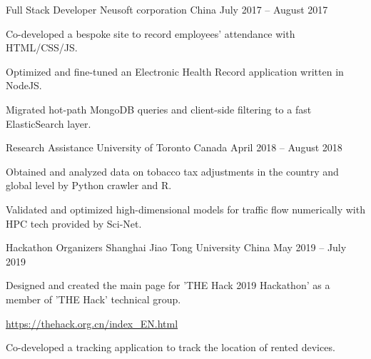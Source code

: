 

\begin{cventries}

  \cventry
    {Full Stack Developer} %
    {Neusoft corporation} %
    {China} %
    {July 2017 – August 2017} %
    {
      \begin{cvitems} %
        \item {Co-developed a bespoke site to record employees’ attendance with HTML/CSS/JS.}
        \item {Optimized and fine-tuned an Electronic Health Record application written in NodeJS.}
        \item {Migrated hot-path MongoDB queries and client-side filtering to a fast ElasticSearch layer.}
      \end{cvitems}
    }

  \cventry
    {Research Assistance} %
    {University of Toronto} %
    {Canada} %
    {April 2018 – August 2018} %
    {
      \begin{cvitems} %
        \item {Obtained and analyzed data on tobacco tax adjustments in the country and global level by Python crawler and R.}
        \item {Validated and optimized high-dimensional models for traffic flow numerically with HPC tech provided by Sci-Net.}
      \end{cvitems}
    }

  \cventry
    {Hackathon Organizers} %
    {Shanghai Jiao Tong University} %
    {China} %
    {May 2019 – July 2019} %
    {
      \begin{cvitems} %
        \item {Designed and created the main page for 'THE Hack 2019 Hackathon' as a member of 'THE Hack' technical group.}
        \item {\qquad \url{https://thehack.org.cn/index_EN.html}}
        \item {Co-developed a tracking application to track the location of rented devices.}
      \end{cvitems}
    }
\end{cventries}
